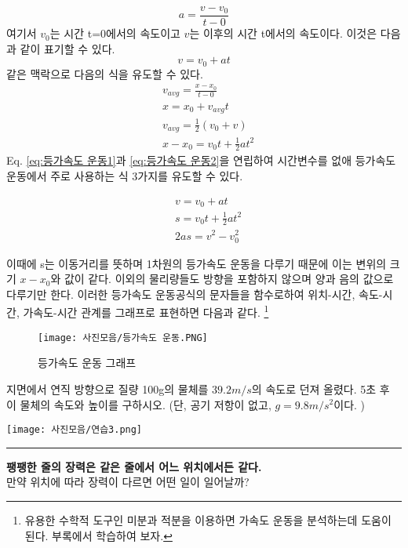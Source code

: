 \begin{flushleft}
    \begin{equation}
      a =\frac{v-v_0}{t-0}
    \end{equation}
      여기서 $v_0$는 시간 t=0에서의 속도이고 $v$는 이후의 시간 t에서의 속도이다. 이것은 다음과 같이 표기할 수 있다.
    \begin{equation}
      v=v_0+at\label{eq:등가속도 운동1}
    \end{equation}
같은 맥락으로 다음의 식을 유도할 수 있다. 
\begin{align}
      &v_{avg} =\frac{x-x_0}{t-0}\\
      &x=x_0+v_{avg}t\\
      &v_{avg}=\frac{1}{2}(v_0+v)\\
      &x-x_0=v_0t+\frac{1}{2}at^2\label{eq:등가속도 운동2}
\end{align}
Eq. \ref{eq:등가속도 운동1}과 \ref{eq:등가속도 운동2}을 연립하여 시간변수를 없애 등가속도 운동에서 주로 사용하는 식 3가지를 유도할 수 있다. 
\begin{defn}
    \begin{align}\label{eq:등가속도 운동공식}
     &v=v_0+at\\
     &s=v_0t+\frac{1}{2}at^2\\
     &2as=v^2-v^2_{0}
    \end{align}
  \end{defn}
 이때에 s는 이동거리를 뜻하며 1차원의 등가속도 운동을 다루기 때문에 이는 변위의 크기 $x-x_0$와 값이 같다. 
 이외의 물리량들도 방향을 포함하지 않으며 양과 음의 값으로 다루기만 한다.
이러한 등가속도 운동공식의 문자들을 함수로하여 위치-시간, 속도-시간, 가속도-시간 관계를 그래프로 표현하면 다음과 같다. 
\footnote{유용한 수학적 도구인 미분과 적분을 이용하면 가속도 운동을 분석하는데 도움이 된다. 부록에서 학습하여 보자.}

\begin{figure}[h]
  \centering
   \texttt{[image: 사진모음/등가속도 운동.PNG]}
   \caption{등가속도 운동 그래프} \label{fig:free-fallig}
 \end{figure}
\clearpage

\begin{task}
지면에서 연직 방향으로 질량 100g의 물체를 $39.2m/s$의 속도로 던져 올렸다. 5초 후 이 물체의 속도와 높이를 구하시오. (단, 공기 저항이 없고, 
$g=9.8m/s^2$이다. )

\end{task}


  \begin{task}
 \begin{flushleft}
  {
  {\texttt{[image: 사진모음/연습3.png]}
  \label{fig:도르래상황}}%
  {\rule{\linewidth}{4cm}}}
 \end{flushleft}
 \textbf{팽팽한 줄의 장력은 같은 줄에서 어느 위치에서든 같다.} \\만약 위치에 따라 장력이 다르면 어떤 일이 일어날까?
\end{task}



\end{flushleft}
